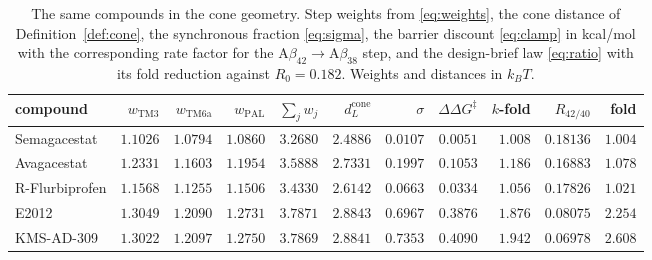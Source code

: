 \documentclass[11pt,reqno]{amsart}
\theoremstyle{plain}
\theoremstyle{definition}
\theoremstyle{remark}
\numberwithin{equation}{section}
\newcommand{\dcone}{d_L^{\mathrm{cone}}}
\newcommand{\Ab}{\mathrm{A}\beta}
\newcommand{\kT}{k_{B}T}
\begin{document}
\begin{table}[ht]
\centering\footnotesize\setlength{\tabcolsep}{3.5pt}
\caption{The same compounds in the cone geometry. Step weights from \eqref{eq:weights}, the cone distance of Definition~\ref{def:cone}, the synchronous fraction \eqref{eq:sigma}, the barrier discount \eqref{eq:clamp} in kcal/mol with the corresponding rate factor for the $\Ab_{42}\to\Ab_{38}$ step, and the design-brief law \eqref{eq:ratio} with its fold reduction against $R_0=0.182$. Weights and distances in $\kT$.}
\label{tab:compb}
\begin{tabular}{@{}l r r r r r r r r r r@{}}
\toprule
compound & $w_{\mathrm{TM3}}$ & $w_{\mathrm{TM6a}}$ & $w_{\mathrm{PAL}}$ & $\sum_jw_j$ & $\dcone$ & $\sigma$ & $\Delta\Delta G^{\ddagger}$ & $k$-fold & $R_{42/40}$ & fold \\
\midrule
Semagacestat & $1.1026$ & $1.0794$ & $1.0860$ & $3.2680$ & $2.4886$ & $0.0107$ & $0.0051$ & $1.008$ & $0.18136$ & $1.004$ \\
Avagacestat & $1.2331$ & $1.1603$ & $1.1954$ & $3.5888$ & $2.7331$ & $0.1997$ & $0.1053$ & $1.186$ & $0.16883$ & $1.078$ \\
R-Flurbiprofen & $1.1568$ & $1.1255$ & $1.1506$ & $3.4330$ & $2.6142$ & $0.0663$ & $0.0334$ & $1.056$ & $0.17826$ & $1.021$ \\
E2012 & $1.3049$ & $1.2090$ & $1.2731$ & $3.7871$ & $2.8843$ & $0.6967$ & $0.3876$ & $1.876$ & $0.08075$ & $2.254$ \\
KMS-AD-309 & $1.3022$ & $1.2097$ & $1.2750$ & $3.7869$ & $2.8841$ & $0.7353$ & $0.4090$ & $1.942$ & $0.06978$ & $2.608$ \\
\bottomrule
\end{tabular}
\end{table}
\end{document}
